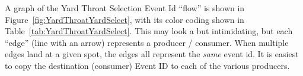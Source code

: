 A graph of the Yard Throat Selection Event Id ``flow'' is shown in
Figure~\ref{fig:YardThroatYardSelect}, with its color coding shown in
Table~\ref{tab:YardThroatYardSelect}. This may look a but intimidating, but
each ``edge'' (line with an arrow) represents a producer / consumer. When
multiple edges land at a given spot, the edges all represent the \textit{same}
event id. It is easiest to copy the destination (consumer) Event ID to each of
the various producers. 

